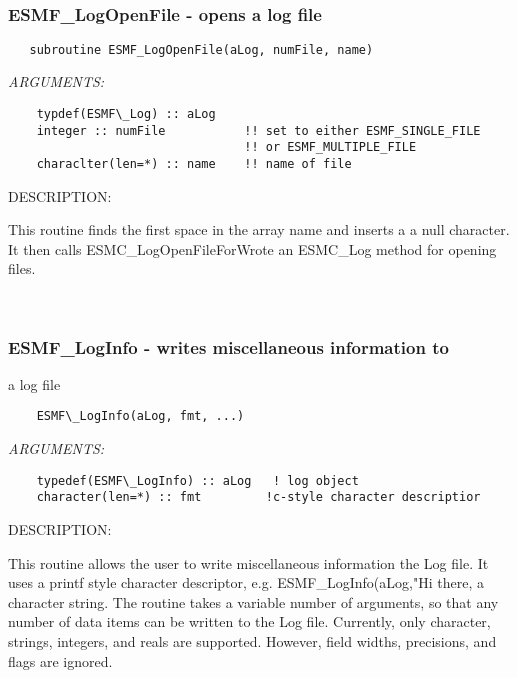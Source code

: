  
\mbox{}\hrulefill\ 
 

  \subsubsection [ESMF\_LogOpenFile] {ESMF\_LogOpenFile - opens a log file}


\begin{verbatim}   subroutine ESMF_LogOpenFile(aLog, numFile, name)\end{verbatim}{\em ARGUMENTS:}
\begin{verbatim}    typdef(ESMF\_Log) :: aLog
    integer :: numFile           !! set to either ESMF_SINGLE_FILE
                                 !! or ESMF_MULTIPLE_FILE 
    characlter(len=*) :: name    !! name of file\end{verbatim}
{\sf DESCRIPTION:\\ }


   This routine finds the first space in the array name and inserts a
   a null character. It then calls ESMC\_LogOpenFileForWrote an ESMC\_Log method
   for opening files.
   
 
\mbox{}\hrulefill\ 
 
\subsubsection [ESMF\_LogInfo] {ESMF\_LogInfo - writes miscellaneous information to }


               a log file
  
\begin{verbatim}     
    ESMF\_LogInfo(aLog, fmt, ...)\end{verbatim}{\em ARGUMENTS:}
\begin{verbatim}    typedef(ESMF\_LogInfo) :: aLog   ! log object
    character(len=*) :: fmt         !c-style character descriptior\end{verbatim}
{\sf DESCRIPTION:\\ }


    This routine allows the user to write miscellaneous information the
    Log file. It uses a printf style character descriptor, e.g. 
    ESMF\_LogInfo(aLog,"Hi there, %
    a character string. The routine takes a variable number of arguments,
    so that any number of data items can be written to the Log file.
    Currently, only character, strings, integers, and reals are supported.
    However, field widths, precisions, and flags are ignored.
   
